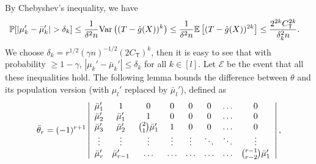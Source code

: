 \documentclass{article}
\def\gE{{\mathcal{E}}}
\newcommand{\E}{\mathbb{E}}
\begin{document}
By Chebyshev's inequality, we have
\begin{equation}
    \notag
    \begin{aligned}
    \mathbb{P}[|\mu_k'-\bar{\mu}_k'|>\delta_k] &\leq \frac{1}{\delta^2 n} \mathrm{Var}\left((T-\hat{g}(X))^k\right) \leq \frac{1}{\delta^2 n} \E\left[ (T-\hat{g}(X))^{2k} \right] \leq \frac{2^{2k}C_{\mathsf{T}}^{2k}}{\delta_k^2 n}.
    \end{aligned}
\end{equation}
We choose $\delta_k = r^{1/2}(\gamma n)^{-1/2} (2C_{\mathsf{T}})^k$, then it is easy to see that with probability $\geq 1-\gamma$, $|\mu_k'-\bar{\mu}_k'| \leq \delta_k$ for all $k\in[l]$. Let $\gE$ be the event that all these inequalities hold. The following lemma bounds the difference between $\theta$ and its population version (with $\mu_l'$ replaced by $\bar{\mu}_l'$), defined as
\begin{equation}
    \notag
    \bar{\theta}_r =(-1)^{r+1}\left|\begin{array}{cccccccc}
    \bar{\mu}_1^{\prime} & 1 & 0 & 0 & 0 & 0 & \ldots & 0 \\
    \bar{\mu}_2^{\prime} & \bar{\mu}_1^{\prime} & 1 & 0 & 0 & 0 & \ldots & 0 \\
    \bar{\mu}_3^{\prime} & \bar{\mu}_2^{\prime} & \binom{2}{1} \bar{\mu}_1^{\prime} & 1 & 0 & 0 & \ldots & 0 \\
    \vdots & \vdots & \vdots & \vdots & \vdots & \ddots & \ddots & \vdots \\
    \bar{\mu}_r^{\prime} & \bar{\mu}_{r-1}^{\prime} & \ldots & \ldots & \ldots & \ldots & \ldots & \binom{r-1}{r-2} \bar{\mu}_1^{\prime}
    \end{array}\right|,
\end{equation}
\end{document}
